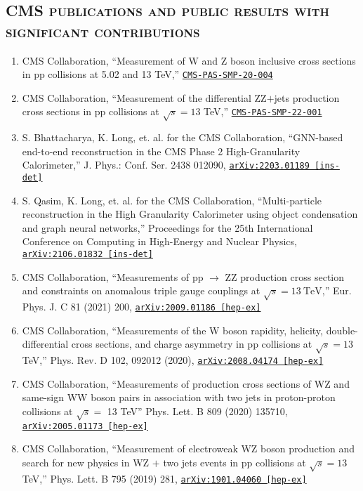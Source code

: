 \documentclass[10pt]{res} %
\begin{document}
\begin{resume}
\vspace{-2mm}
\section{\textsc{CMS publications and public results with significant contributions}}
\begin{enumerate}
  \item CMS Collaboration, ``Measurement of W and Z boson inclusive cross sections in pp collisions at 5.02 and 13 TeV,'' \href{https://cds.cern.ch/record/2868090}{\texttt{CMS-PAS-SMP-20-004}} 
  \item CMS Collaboration, ``Measurement of the differential ZZ$+$jets production cross sections in pp collisions at $\sqrt{s} = 13$ TeV,'' \href{https://cds.cern.ch/record/2859350}{\texttt{CMS-PAS-SMP-22-001}} 
  \item S. Bhattacharya, K. Long, et. al. for the CMS Collaboration, ``GNN-based end-to-end reconstruction in the CMS Phase 2 High-Granularity Calorimeter,'' J. Phys.: Conf. Ser. 2438 012090, \href{https://arxiv.org/abs/2203.01189}{\texttt{arXiv:2203.01189 [ins-det]}} 
  \item S. Qasim, K. Long, et. al. for the CMS Collaboration, ``Multi-particle reconstruction in the High Granularity Calorimeter using object condensation and graph neural networks,'' Proceedings for the 25th International Conference on Computing in High-Energy and Nuclear Physics, \href{https://arxiv.org/abs/2106.01832}{\texttt{arXiv:2106.01832 [ins-det]}} 
  \item CMS Collaboration, ``Measurements of pp $\rightarrow$ ZZ production cross section and constraints on anomalous triple gauge couplings at $\sqrt{s} = 13~\mathrm{TeV}$,'' Eur. Phys. J. C 81 (2021) 200, \href{https://arxiv.org/abs/2009.01186}{\texttt{arXiv:2009.01186 [hep-ex]}}
  \item CMS Collaboration, ``Measurements of the W boson rapidity, helicity, double-differential cross sections, and charge asymmetry in pp collisions at $\sqrt{s}=13$\,TeV,'' Phys. Rev. D 102, 092012 (2020), \href{https://arxiv.org/abs/2008.04174}{\texttt{arXiv:2008.04174 [hep-ex]}}
  \item CMS Collaboration, ``Measurements of production cross sections of WZ and same-sign WW boson pairs in association with two jets in proton-proton collisions at $\sqrt{s} =$ 13 TeV'' Phys. Lett. B 809 (2020) 135710, \href{https://arxiv.org/abs/2005.01173}{\texttt{arXiv:2005.01173 [hep-ex]}}
  \item CMS Collaboration, ``Measurement of electroweak WZ boson production and search for new physics in WZ $+$ two jets events in pp collisions at $\sqrt{s}=13$\,TeV,'' Phys. Lett. B 795 (2019) 281, \href{https://arxiv.org/abs/1901.04060} {\texttt{arXiv:1901.04060 [hep-ex]}}

\end{enumerate}
\end{resume}
\end{document}
